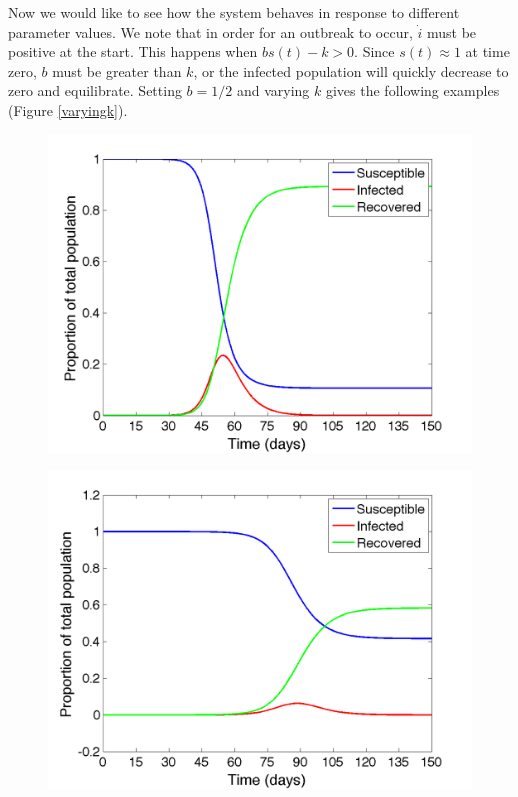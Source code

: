 \documentclass{article}
\begin{document}
Now we would like to see how the system behaves in response to different parameter values.  We note that in order for an outbreak to occur, $\dot{i}$ must be positive at the start.  This happens when $bs(t)-k>0$.  Since $s(t) \approx 1$ at time zero, $b$ must be greater than $k$, or the infected population will quickly decrease to zero and equilibrate.  Setting $b=1/2$ and varying $k$ gives the following examples (Figure \ref{varyingk}). 
\begin{figure}[h!]
\centering
\begin{minipage}{.32\textwidth}
  \centering
  \includegraphics[width=\linewidth]{b05k02.png}
  \label{fig:k5days}
\end{minipage}%
\begin{minipage}{.32\textwidth}
  \centering
  \includegraphics[width=\linewidth]{b05k033333.png}

\end{minipage}
\end{figure}
\end{document}
